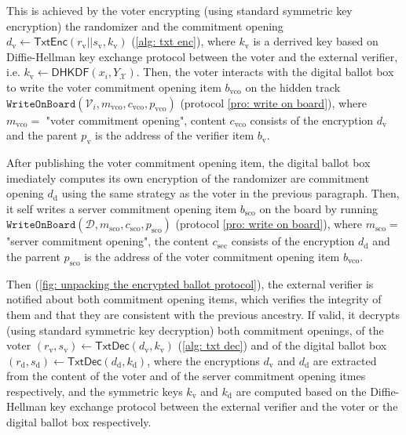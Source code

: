 This is achieved by the voter encrypting (using standard symmetric key encryption) the randomizer and the commitment opening $d_\mathrm{v} \gets \mathsf{TxtEnc}(r_\mathrm{v} || s_\mathrm{v}, k_\mathrm{v})$ (\cref{alg: txt enc}), where $k_\mathrm{v}$ is a derrived key based on Diffie-Hellman key exchange protocol between the voter and the external verifier, i.e. $k_\mathrm{v} \gets \mathsf{DHKDF}(x_i, Y_\mathcal{X})$. Then, the voter interacts with the digital ballot box to write the voter commitment opening item $b_\mathrm{vco}$ on the hidden track $\mathtt{WriteOnBoard}(\mathcal{V}_i, m_\mathrm{vco}, c_\mathrm{vco}, p_\mathrm{vco})$ (protocol \ref{pro: write on board}), where $m_\mathrm{vco} = $ "voter commitment opening", content $c_\mathrm{vco}$ consists of the encryption $d_\mathrm{v}$ and the parent $p_\mathrm{v}$ is the address of the verifier item $b_\mathrm{v}$.

After publishing the voter commitment opening item, the digital ballot box imediately computes its own encryption of the randomizer are commitment opening $d_\mathrm{d}$ using the same strategy as the voter in the previous paragraph. Then, it self writes a server commitment opening item $b_\mathrm{sco}$ on the board by running $\mathtt{WriteOnBoard}(\mathcal{D}, m_\mathrm{sco}, c_\mathrm{sco}, p_\mathrm{sco})$ (protocol \ref{pro: write on board}), where $m_\mathrm{sco} =$ "server commitment opening", the content $c_\mathrm{sec}$ consists of the encryption $d_\mathrm{d}$ and the parrent $p_\mathrm{sco}$ is the address of the voter commitment opening item $b_\mathrm{vco}$. 

Then (\cref{fig: unpacking the encrypted ballot protocol}), the external verifier is notified about both commitment opening items, which verifies the integrity of them and that they are consistent with the previous ancestry. If valid, it decrypts (using standard symmetric key decryption) both commitment openings, of the voter $(r_\mathrm{v}, s_\mathrm{v}) \gets \mathsf{TxtDec}(d_\mathrm{v}, k_\mathrm{v})$ (\cref{alg: txt dec}) and of the digital ballot box $(r_\mathrm{d}, s_\mathrm{d}) \gets \mathsf{TxtDec}(d_\mathrm{d}, k_\mathrm{d})$, where the encryptions $d_\mathrm{v}$ and $d_\mathrm{d}$ are extracted from the content of the voter and of the server commitment opening itmes respectively, and the symmetric keys $k_\mathrm{v}$ and $k_\mathrm{d}$ are computed based on the Diffie-Hellman key exchange protocol between the external verifier and the voter or the digital ballot box respectively.


